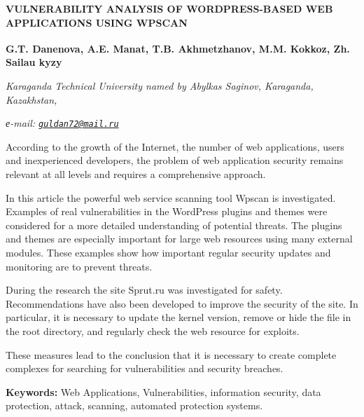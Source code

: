 \begin{articleheader}
{\bfseries VULNERABILITY ANALYSIS OF WORDPRESS-BASED WEB APPLICATIONS USING WPSCAN}

{\bfseries
G.T. Danenova\textsuperscript{\envelope },
A.E. Manat,
T.B. Akhmetzhanov,
M.M. Kokkoz,
Zh. Sailau kyzy}
\end{articleheader}

\begin{affiliation}
\emph{Karaganda Technical University named by Abylkas Saginov, Karaganda, Kazakhstan,}

\emph{е-mail: \href{mailto:guldan72@mail.ru}{\nolinkurl{guldan72@mail.ru}}}
\end{affiliation}

According to the growth of the Internet, the number of web applications,
users and inexperienced developers, the problem of web application
security remains relevant at all levels and requires a comprehensive
approach.

In this article the powerful web service scanning tool Wpscan is
investigated. Examples of real vulnerabilities in the WordPress plugins
and themes were considered for a more detailed understanding of
potential threats. The plugins and themes are especially important for
large web resources using many external modules. These examples show how
important regular security updates and monitoring are to prevent
threats.

During the research the site Sprut.ru was investigated for safety.
Recommendations have also been developed to improve the security of the
site. In particular, it is necessary to update the kernel version,
remove or hide the file in the root directory, and regularly check the
web resource for exploits.

These measures lead to the conclusion that it is necessary to create
complete complexes for searching for vulnerabilities and security
breaches.

{\bfseries Keywords:} Web Applications, Vulnerabilities, information security, data
protection, attack, scanning, automated protection systems.

